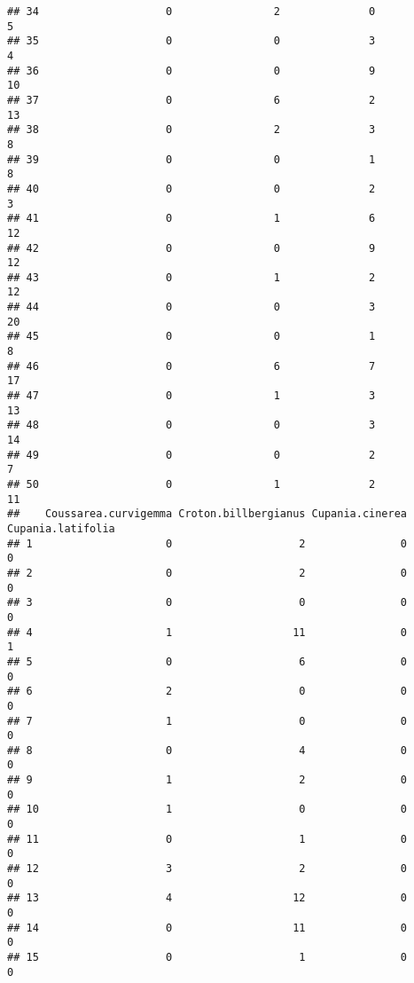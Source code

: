 \documentclass[
]{article}
\begin{document}
\begin{verbatim}
## 34                    0                2              0                 5
## 35                    0                0              3                 4
## 36                    0                0              9                10
## 37                    0                6              2                13
## 38                    0                2              3                 8
## 39                    0                0              1                 8
## 40                    0                0              2                 3
## 41                    0                1              6                12
## 42                    0                0              9                12
## 43                    0                1              2                12
## 44                    0                0              3                20
## 45                    0                0              1                 8
## 46                    0                6              7                17
## 47                    0                1              3                13
## 48                    0                0              3                14
## 49                    0                0              2                 7
## 50                    0                1              2                11
##    Coussarea.curvigemma Croton.billbergianus Cupania.cinerea Cupania.latifolia
## 1                     0                    2               0                 0
## 2                     0                    2               0                 0
## 3                     0                    0               0                 0
## 4                     1                   11               0                 1
## 5                     0                    6               0                 0
## 6                     2                    0               0                 0
## 7                     1                    0               0                 0
## 8                     0                    4               0                 0
## 9                     1                    2               0                 0
## 10                    1                    0               0                 0
## 11                    0                    1               0                 0
## 12                    3                    2               0                 0
## 13                    4                   12               0                 0
## 14                    0                   11               0                 0
## 15                    0                    1               0                 0

\end{verbatim}
\end{document}
